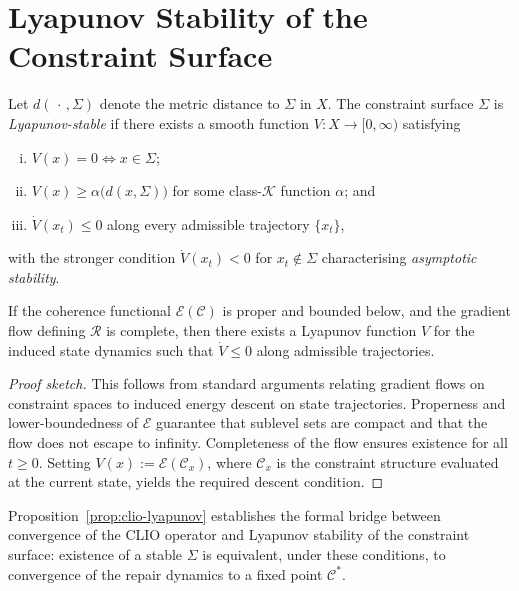 \documentclass[11pt,openany]{book}
\begin{document}
\section{Lyapunov Stability of the Constraint Surface}
\label{sec:lyapunov_b}

\begin{definition}
\label{def:lyapunov-stability}
Let $d(\,\cdot\,,\Sigma)$ denote the metric distance to
$\Sigma$ in $X$.  The constraint surface $\Sigma$ is
\emph{Lyapunov-stable} if there exists a smooth function
$V : X \to [0,\infty)$ satisfying
\begin{enumerate}[(i)]
  \item $V(x) = 0 \iff x \in \Sigma$;
  \item $V(x) \ge \alpha\bigl(d(x,\Sigma)\bigr)$ for some
    class-$\mathcal{K}$ function $\alpha$; and
  \item $\dot{V}(x_t) \le 0$ along every admissible
    trajectory $\{x_t\}$,
\end{enumerate}
with the stronger condition $\dot{V}(x_t) < 0$ for
$x_t \notin \Sigma$ characterising \emph{asymptotic stability}.
\end{definition}

\begin{proposition}
\label{prop:clio-lyapunov_b}
If the coherence functional $\mathcal{E}(\mathcal{C})$ is
proper and bounded below, and the gradient flow defining
$\mathcal{R}$ is complete, then there exists a Lyapunov
function $V$ for the induced state dynamics such that
$\dot{V} \le 0$ along admissible trajectories.
\end{proposition}

\begin{proof}[Proof sketch]
This follows from standard arguments relating gradient flows
on constraint spaces to induced energy descent on state
trajectories.  Properness and lower-boundedness of
$\mathcal{E}$ guarantee that sublevel sets are compact and
that the flow does not escape to infinity.  Completeness
of the flow ensures existence for all $t \ge 0$.  Setting
$V(x) := \mathcal{E}(\mathcal{C}_x)$, where $\mathcal{C}_x$
is the constraint structure evaluated at the current state,
yields the required descent condition.
\end{proof}

\begin{remark}
Proposition~\ref{prop:clio-lyapunov} establishes the formal
bridge between convergence of the CLIO operator and
Lyapunov stability of the constraint surface: existence of a
stable $\Sigma$ is equivalent, under these conditions, to
convergence of the repair dynamics to a fixed point
$\mathcal{C}^*$.
\end{remark}
\end{document}

